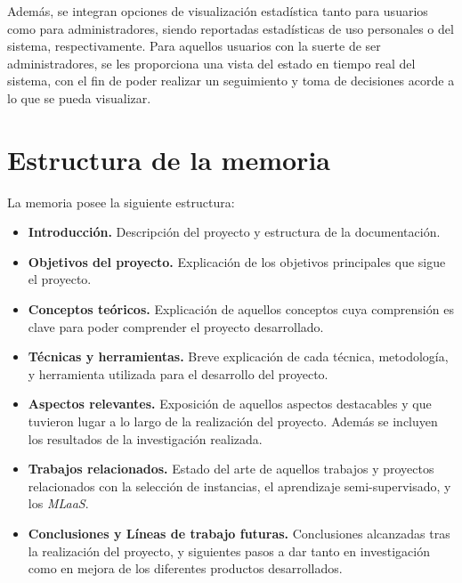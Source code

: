 Además, se integran opciones de visualización estadística tanto para usuarios como para administradores, siendo reportadas estadísticas de uso personales o del sistema, respectivamente. Para aquellos usuarios con la suerte de ser administradores, se les proporciona una vista del estado en tiempo real del sistema, con el fin de poder realizar un seguimiento y toma de decisiones acorde a lo que se pueda visualizar.

\section{Estructura de la memoria}\label{estructura-de-la-memoria}
La memoria posee la siguiente estructura:
\begin{itemize}
\item \textbf{Introducción.} Descripción del proyecto y estructura de la documentación.
\item \textbf{Objetivos del proyecto.} Explicación de los objetivos principales que sigue el proyecto.
\item \textbf{Conceptos teóricos.} Explicación de aquellos conceptos cuya comprensión es clave para poder comprender el proyecto desarrollado.
\item \textbf{Técnicas y herramientas.} Breve explicación de cada técnica, metodología, y herramienta utilizada para el desarrollo del proyecto.
\item \textbf{Aspectos relevantes.} Exposición de aquellos aspectos destacables y que tuvieron lugar a lo largo de la realización del proyecto. Además se incluyen los resultados de la investigación realizada.
\item \textbf{Trabajos relacionados.} Estado del arte de aquellos trabajos y proyectos relacionados con la selección de instancias, el aprendizaje semi-supervisado, y los \textit{MLaaS}.
\item \textbf{Conclusiones y Líneas de trabajo futuras.} Conclusiones alcanzadas tras la realización del proyecto, y siguientes pasos a dar tanto en investigación como en mejora de los diferentes productos desarrollados.
\end{itemize}

